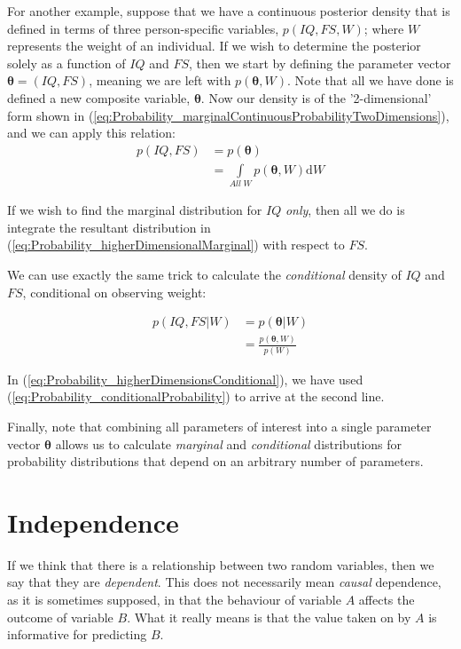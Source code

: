\documentclass[11pt,fullpage]{book}
\begin{document}
For another example, suppose that we have a continuous posterior density that is defined in terms of three person-specific variables, $p(IQ,FS,W)$; where $W$ represents the weight of an individual. If we wish to determine the posterior solely as a function of $IQ$ and $FS$, then we start by defining the parameter vector $\boldsymbol{\theta} = (IQ,FS)$, meaning we are left with $p(\boldsymbol{\theta},W)$. Note that all we have done is defined a new composite variable, $\boldsymbol{\theta}$. Now our density is of the '2-dimensional' form shown in (\ref{eq:Probability_marginalContinuousProbabilityTwoDimensions}), and we can apply this relation:\\

\begin{align}\label{eq:Probability_higherDimensionalMarginal}
p(IQ,FS) &= p(\boldsymbol{\theta})\\
&= \int\limits_{All\; W} p(\boldsymbol{\theta},W)\mathrm{d}W
\end{align}

If we wish to find the marginal distribution for $IQ$ \textit{only}, then all we do is integrate the resultant distribution in (\ref{eq:Probability_higherDimensionalMarginal}) with respect to $FS$.

We can use exactly the same trick to calculate the \textit{conditional} density of $IQ$ and $FS$, conditional on observing weight:

\begin{align}\label{eq:Probability_higherDimensionsConditional}
p(IQ,FS|W) &= p(\boldsymbol{\theta}|W)\\
&= \frac{p(\boldsymbol{\theta},W)}{p(W)}
\end{align}

In (\ref{eq:Probability_higherDimensionsConditional}), we have used (\ref{eq:Probability_conditionalProbability}) to arrive at the second line.

Finally, note that combining all parameters of interest into a single parameter vector $\boldsymbol{\theta}$ allows us to calculate \textit{marginal} and \textit{conditional} distributions for probability distributions that depend on an arbitrary number of parameters.

\section{Independence}\label{sec:Probability_independence}
If we think that there is a relationship between two random variables, then we say that they are \textit{dependent}. This does not necessarily mean \textit{causal} dependence, as it is sometimes supposed, in that the behaviour of variable $A$ affects the outcome of variable $B$. What it really means is that the value taken on by $A$ is informative for predicting $B$. 
\end{document}
